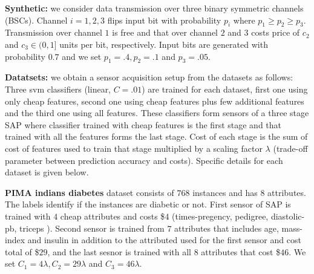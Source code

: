 {\bf Synthetic:} we consider data transmission over three binary symmetric channels (BSCs). Channel $i=1,2,3$ flips input bit with probability $p_i$ where $p_1\geq p_2\geq p_3$. Transmission over channel $1$ is free and that over channel $2$ and $3$ costs price of $ c_2$ and $c_3\in (0,1] $ units per bit, respectively. Input bits are generated with probability $0.7$ and we set $p_1=.4, p_2=.1$ and $p_3=.05$.

{\bf Datatsets:} we obtain a sensor acquisition setup from the datasets as follows: Three svm classifiers (linear, $C=.01$) are trained for each dataset, first one using only cheap features, second one  using cheap features plus few additional features and the third one using all features. These classifiers form sensors of a three stage SAP where classifier trained with cheap features is the first stage and that trained with all the features forms the last stage. Cost of each stage is the sum of cost of features used to train that stage multiplied by a scaling factor $\lambda$ (trade-off parameter between prediction accuracy and costs). Specific details for each dataset is given below.  

{\bf PIMA indians diabetes} dataset consists of $768$ instances and has $8$ attributes. The labels identify if the instances are diabetic or not. First sensor of SAP is trained with $4$ cheap attributes and costs \$$4$ (times-pregency, pedigree, diastolic-pb, triceps ). Second sensor is trained from $7$ attributes that includes age, mass-index and insulin in addition to the attributed used for the first sensor and cost total of \$$29$, and the last sesnor is trained with all $8$ attributes that cost \$$46$. We set $C_1= 4\lambda, C_2= 29\lambda$ and $C_3= 46\lambda$.

